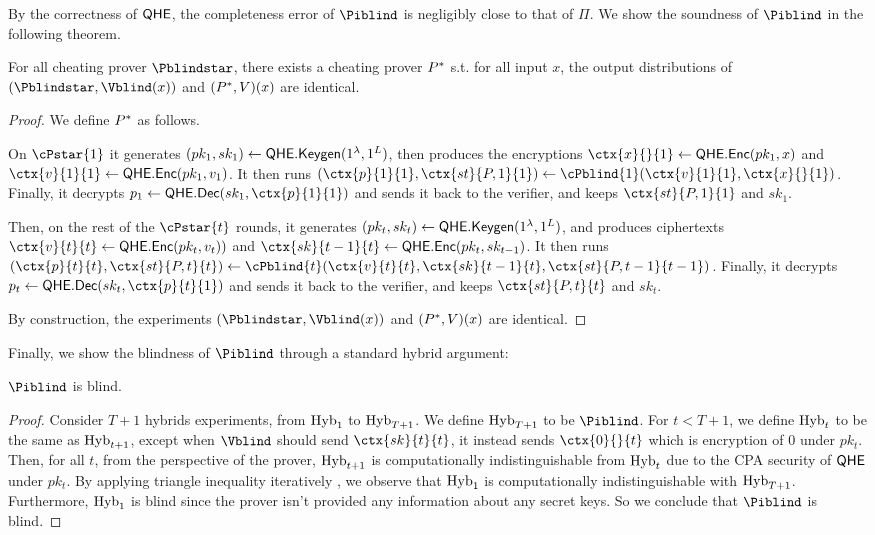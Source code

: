 By the correctness of $\mathsf{QHE}$, the completeness error of $\Piblind$ is negligibly close to that of $\Pi$.
We show the soundness of $\Piblind$ in the following theorem.

\begin{theorem}
	For all cheating prover $\Pblindstar$, there exists a cheating prover $P^*$ s.t. for all input $x$, the output distributions of $(\Pblindstar, \Vblind(x))$ and $(P^*, V)(x)$ are identical.
\end{theorem}
\begin{proof}
	We define $P^*$ as follows.
	
	On $\cPstar{1}$ it generates
	$(pk_1, sk_1)\leftarrow\mathsf{QHE.Keygen}(1^\lambda, 1^L)$, then produces the encryptions
	$\ctx{x}{}{1}\leftarrow\QEnc(pk_1, x)$ and $\ctx{v}{1}{1}\leftarrow\QEnc(pk_1, v_1)$.
	It then runs $(\ctx{p}{1}{1}, \ctx{st}{P, 1}{1})\leftarrow\cPblind{1}(\ctx{v}{1}{1}, \ctx{x}{}{1})$.
	Finally, it decrypts $p_1\leftarrow\QDec(sk_1, \ctx{p}{1}{1})$ and sends it back to the verifier,
	and keeps $\ctx{st}{P, 1}{1}$ and $sk_1$.

	Then, on the rest of the $\cPstar{t}$ rounds, it generates
	$(pk_t, sk_t)\leftarrow\mathsf{QHE.Keygen}(1^\lambda, 1^L)$, and produces ciphertexts
	$\ctx{v}{t}{t}\leftarrow\QEnc(pk_t, v_t))$ and $\ctx{sk}{t-1}{t}\leftarrow\QEnc(pk_t, sk_{t-1})$.
	It then runs $(\ctx{p}{t}{t}, \ctx{st}{P, t}{t})\leftarrow\cPblind{t}(\ctx{v}{t}{t}, \ctx{sk}{t-1}{t}, \ctx{st}{P, t-1}{t-1})$.
	Finally, it decrypts $p_t\leftarrow\QDec(sk_t, \ctx{p}{t}{1})$ and sends it back to the verifier,
	and keeps $\ctx{st}{P, t}{t}$ and $sk_t$.
		
	By construction, the experiments $(\Pblindstar, \Vblind(x))$ and $(P^*, V)(x)$ are identical.
\end{proof}

Finally, we show the blindness of $\Piblind$ through a standard hybrid argument:
\begin{theorem}
	$\Piblind$ is blind.
\end{theorem}
\begin{proof}
	Consider $T+1$ hybrids experiments, from $\operatorname{Hyb}_1$ to $\operatorname{Hyb}_{T+1}$.
	We define $\operatorname{Hyb}_{T+1}$ to be $\Piblind$.
	For $t<T+1$, we define $\operatorname{Hyb}_{t}$ to be the same as $\operatorname{Hyb}_{t+1}$,
	except when $\Vblind$ should send $\ctx{sk}{t}{t}$, it instead sends $\ctx{0}{}{t}$ which is encryption of $0$ under $pk_t$.
	Then, for all $t$, from the perspective of the prover, $\operatorname{Hyb}_{t+1}$ is computationally indistinguishable from $\operatorname{Hyb}_t$ due to the CPA security of $\mathsf{QHE}$ under $pk_t$.
	By applying triangle inequality iteratively , we observe that $\operatorname{Hyb}_1$ is computationally indistinguishable with $\operatorname{Hyb}_{T+1}$.
	Furthermore, $\operatorname{Hyb}_1$ is blind since the prover isn't provided any information about any secret keys.
	So we conclude that $\Piblind$ is blind.
\end{proof}


